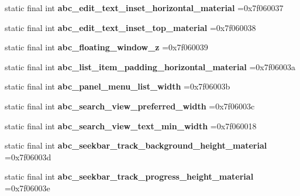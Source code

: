\begin{DoxyCompactItemize}
static final int {\bfseries abc\+\_\+edit\+\_\+text\+\_\+inset\+\_\+horizontal\+\_\+material} =0x7f060037
\item 
\mbox{\label{classproject4_1_1xaria_1_1R_1_1dimen_ac8b82923c9391a009f598818796e6ac5}} 
static final int {\bfseries abc\+\_\+edit\+\_\+text\+\_\+inset\+\_\+top\+\_\+material} =0x7f060038
\item 
\mbox{\label{classproject4_1_1xaria_1_1R_1_1dimen_aa1312115ad740231d3c1887c8d0d3f7c}} 
static final int {\bfseries abc\+\_\+floating\+\_\+window\+\_\+z} =0x7f060039
\item 
\mbox{\label{classproject4_1_1xaria_1_1R_1_1dimen_a0d646416d8e3c64c0daec047b0eac10a}} 
static final int {\bfseries abc\+\_\+list\+\_\+item\+\_\+padding\+\_\+horizontal\+\_\+material} =0x7f06003a
\item 
\mbox{\label{classproject4_1_1xaria_1_1R_1_1dimen_a1ff5c8562ad2156bf9cdc5f1c2f11f8f}} 
static final int {\bfseries abc\+\_\+panel\+\_\+menu\+\_\+list\+\_\+width} =0x7f06003b
\item 
\mbox{\label{classproject4_1_1xaria_1_1R_1_1dimen_a1bb1c7a593b671ceec822d834cca9e00}} 
static final int {\bfseries abc\+\_\+search\+\_\+view\+\_\+preferred\+\_\+width} =0x7f06003c
\item 
\mbox{\label{classproject4_1_1xaria_1_1R_1_1dimen_a29c705a01cea218ecedc095760406b91}} 
static final int {\bfseries abc\+\_\+search\+\_\+view\+\_\+text\+\_\+min\+\_\+width} =0x7f060018
\item 
\mbox{\label{classproject4_1_1xaria_1_1R_1_1dimen_a36d51a527d86d28a468f7765609611bc}} 
static final int {\bfseries abc\+\_\+seekbar\+\_\+track\+\_\+background\+\_\+height\+\_\+material} =0x7f06003d
\item 
\mbox{\label{classproject4_1_1xaria_1_1R_1_1dimen_a0724c56de224b642a892edc2a51c4b2b}} 
static final int {\bfseries abc\+\_\+seekbar\+\_\+track\+\_\+progress\+\_\+height\+\_\+material} =0x7f06003e

\end{DoxyCompactItemize}

